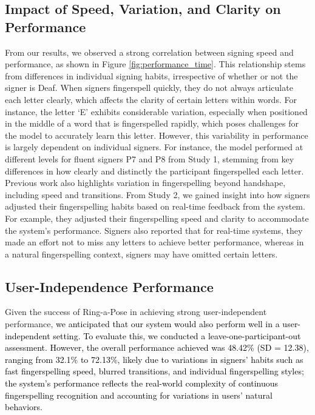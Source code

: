  
\subsection{Impact of Speed, Variation, and Clarity on Performance} \label{impact_speed}
From our results, we observed a strong correlation between signing speed and performance, as shown in Figure \ref{fig:performance_time}. This relationship stems from differences in individual signing habits, irrespective of whether or not the signer is Deaf. When signers fingerspell quickly, they do not always articulate each letter clearly, which affects the clarity of certain letters within words. For instance, the letter `E' exhibits considerable variation, especially when positioned in the middle of a word that is fingerspelled rapidly, which poses challenges for the model to accurately learn this letter. However, this variability in performance is largely dependent on individual signers. For instance, the model performed at different levels for fluent signers P7 and P8 from Study 1, stemming from key differences in how clearly and distinctly the participant fingerspelled each letter. Previous work \cite{keane2016fingerspelling} also highlights variation in fingerspelling beyond handshape, including speed and transitions. From Study 2, we gained insight into how signers adjusted their fingerspelling habits based on real-time feedback from the system. For example, they adjusted their fingerspelling speed and clarity to accommodate the system's performance. Signers also reported that for real-time systems, they made an effort not to miss any letters to achieve better performance, whereas in a natural fingerspelling context, signers may have omitted certain letters.




\subsection{User-Independence Performance} \label{pretrained model}
Given the success of Ring-a-Pose \cite{yu2024ring} in achieving strong user-independent performance, \textcolor{black}{we anticipated that our system would also perform well in a user-independent setting. To evaluate this, we conducted a leave-one-participant-out assessment. \textcolor{black}{However, the overall performance achieved was 48.42\% (SD = 12.38), ranging from 32.1\% to 72.13\%, likely due to variations in signers' habits such as fast fingerspelling speed, blurred transitions, and individual fingerspelling styles; the system's performance reflects the real-world complexity of continuous fingerspelling recognition and accounting for variations in users' natural behaviors.}}

